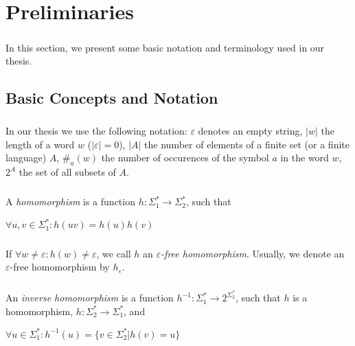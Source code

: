 \chapter{Preliminaries}
\label{chap:Preliminaries}

\paragraph{}
In this section, we present some basic notation and terminology used in our thesis.

\section{Basic Concepts and Notation}

\paragraph{}
\oznacenie In our thesis we use the following notation: $\varepsilon $ denotes an empty string, $|w|$ the length of a word $w$ ($|\varepsilon |=0$), $|A|$ the number of elements of a finite set (or a finite language) $A$, $\# _{a}(w)$ the number of occurences of the symbol $a$ in the word $w$, $2^{A}$ the set of all subsets of $A$.

\paragraph{}
 A \emph{homomorphism} is a function $h: \Sigma_{1}^{*} \rightarrow \Sigma_{2}^{*}$, such that \\	
\centerline{$\forall u, v \in \Sigma_1^*: h(uv) = h(u)h(v)$}

\paragraph{}
\oznacenie If $\forall w \neq \varepsilon : h(w) \neq \varepsilon $, we call $h$ an \emph{$\varepsilon $-free homomorphism}. Usually, we denote an $\varepsilon $-free homomorphism by $h_{\varepsilon }$.

\paragraph{}
 An \emph{inverse homomorphism} is a function $h^{-1}: \Sigma_{1}^{*} \rightarrow 2^{\Sigma_{2}^{*}}$, such that $h$ is a homomorphism, $h: \Sigma_2^* \rightarrow \Sigma_1^*$, and \\
\centerline{$\forall u \in \Sigma_1^*: h^{-1}(u) = \{ v \in \Sigma_2^* | h(v) = u \} $}

